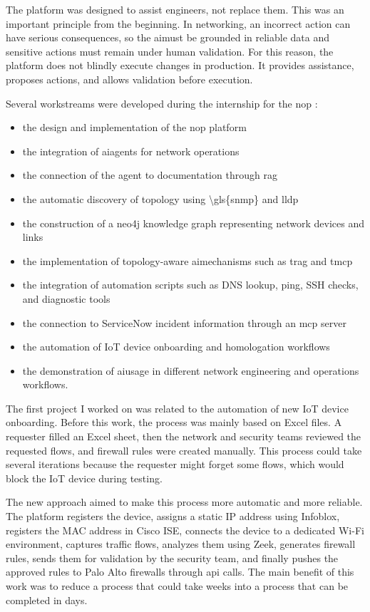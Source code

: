 \documentclass[11pt,a4paper]{report}
\begin{document}
The platform was designed to assist engineers, not replace them. This was an important principle from the beginning. In networking, an incorrect action can have serious consequences, so the \gls{ai}must be grounded in reliable data and sensitive actions must remain under human validation. For this reason, the platform does not blindly execute changes in production. It provides assistance, proposes actions, and allows validation before execution.

Several workstreams were developed during the internship for the  \gls{nop} :

\begin{itemize}
    \item the design and implementation of the  \gls{nop}  platform
    \item the integration of \gls{ai}agents for network operations
    \item the connection of the agent to documentation through  \gls{rag} 
    \item the automatic discovery of \gls{topology} using \gls{\gls{snmp}} and \gls{lldp} 
    \item the construction of a  \gls{neo4j}  knowledge graph representing network devices and links
    \item the implementation of topology-aware \gls{ai}mechanisms such as  \gls{trag}  and  \gls{tmcp} 
    \item the integration of automation scripts such as DNS lookup, ping, SSH checks, and diagnostic tools
    \item the connection to ServiceNow incident information through an \gls{mcp}  server
    \item the automation of IoT device onboarding and homologation workflows
    \item the demonstration of \gls{ai}usage in different network engineering and operations workflows.
\end{itemize}

The first project I worked on was related to the automation of new IoT device onboarding. Before this work, the process was mainly based on Excel files. A requester filled an Excel sheet, then the network and security teams reviewed the requested flows, and firewall rules were created manually. This process could take several iterations because the requester might forget some flows, which would block the IoT device during testing.

The new approach aimed to make this process more automatic and more reliable. The platform registers the device, assigns a static IP address using Infoblox, registers the MAC address in Cisco ISE, connects the device to a dedicated Wi-Fi environment, captures traffic flows, analyzes them using Zeek, generates firewall rules, sends them for validation by the security team, and finally pushes the approved rules to Palo Alto firewalls through \gls{api} calls. The main benefit of this work was to reduce a process that could take weeks into a process that can be completed in days.
\end{document}

